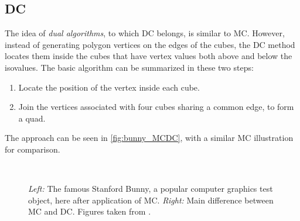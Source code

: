 \subsection{\Acl{DC}}
The idea of \emph{dual algorithms}, to which \acf{DC} belongs, is similar to \ac{MC}. However, instead of generating polygon vertices on the edges of the cubes, the \ac{DC} method locates them inside the cubes that have vertex values both above and below the isovalues. The basic algorithm can be summarized in these two steps:
\begin{enumerate}
\item Locate the position of the vertex inside each cube.
\item Join the vertices associated with four cubes sharing a common edge, to form a \ac{quad}.
\end{enumerate}
The approach can be seen in \autoref{fig:bunny_MCDC}, with a similar \ac{MC} illustration for comparison. 

\begin{figure}
\centering
   \\
   \caption{\textit{Left:} The famous Stanford Bunny, a popular computer graphics test object, here after application of \ac{MC}. \textit{Right:} Main difference between \ac{MC} and \ac{DC}.  Figures taken from \cite{Hermite2002}. }
   \label{fig:bunny_MCDC}
\end{figure}

